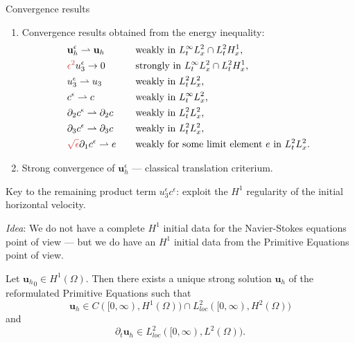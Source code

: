 \documentclass{beamer}
\begin{document}
\begin{frame}{Convergence results}
\begin{enumerate}
\item Convergence results obtained from the energy inequality:
    \begin{align} 
    &  \mathbf{u}_h^\epsilon \rightharpoonup \mathbf{u}_h &\quad & \text{weakly in $L_t^\infty L_x^2 \cap L_t^2 H_x^1$,} \nonumber \\
    &  \textcolor{jasper}{\epsilon^2} u_3^\epsilon \to 0 &\quad & \text{strongly in $L_t^\infty L_x^2 \cap L_t^2 H_x^1$,} \nonumber \\ 
    & u_3^\epsilon \rightharpoonup u_3  &\quad & \text{weakly in $L_t^2 L_x^2$,} \nonumber \\
    & c^\epsilon \rightharpoonup c &\quad & \text{weakly in $L_t^\infty L_x^2$,} \nonumber \\
    & \partial_2 c^\epsilon \rightharpoonup \partial_2 c &\quad & \text{weakly in $L_t^2 L_x^2$,} \nonumber \\
    & \partial_3 c^\epsilon \rightharpoonup \partial_3 c &\quad & \text{weakly in $L_t^2 L_x^2$,} \nonumber \\
    & \textcolor{jasper}{\sqrt{\epsilon}} \partial_1 c^\epsilon \rightharpoonup e &\quad & \text{weakly for some limit element $e$ in $L_t^2 L_x^2$.} \nonumber
  \end{align}
\item Strong convergence of $\mathbf{u}_h^\epsilon$ --- classical translation criterium.
\end{enumerate}
\end{frame}

\begin{frame}
\vspace{-0.5cm}
Key to the remaining product term $u_3^\epsilon c^\epsilon$: exploit the $H^1$ regularity of the initial horizontal velocity.

\textit{Idea}: We do not have a complete $H^1$ initial data for the Navier-Stokes equations point of view --- but we do have an $H^1$ initial data from the Primitive Equations point of view.

\begin{theorem}
Let ${\mathbf{u}_h}_0 \in H^1(\Omega).$ Then there exists a unique strong solution $\mathbf{u}_h$ of the reformulated Primitive Equations such that $$\mathbf{u}_h \in C([0, \infty), H^1(\Omega)) \cap L^2_{loc}([0, \infty), H^2(\Omega))$$ and $$\partial_t \mathbf{u}_h \in L^2_{loc} ([0,\infty), L^2(\Omega)).$$
\end{theorem}

\end{frame}
\end{document}

